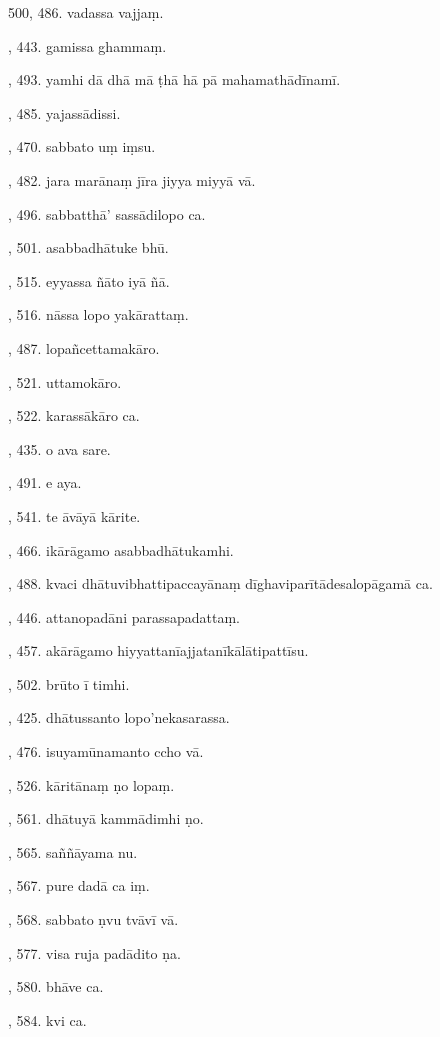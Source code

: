 500, 486. vadassa vajjaṃ.\par {}, 443. gamissa ghammaṃ.\par {}, 493. yamhi dā dhā mā ṭhā hā pā mahamathādīnamī.\par {}, 485. yajassādissi.\par {}, 470. sabbato uṃ iṃsu.\par {}, 482. jara marānaṃ jīra jiyya miyyā vā.\par {}, 496. sabbatthā’ sassādilopo ca.\par {}, 501. asabbadhātuke bhū.\par {}, 515. eyyassa ñāto iyā ñā.\par {}, 516. nāssa lopo yakārattaṃ.\par {}, 487. lopañcettamakāro.\par {}, 521. uttamokāro.\par {}, 522. karassākāro ca.\par {}, 435. o ava sare.\par {}, 491. e aya.\par {}, 541. te āvāyā kārite.\par {}, 466. ikārāgamo asabbadhātukamhi.\par {}, 488. kvaci dhātuvibhattipaccayānaṃ dīghaviparītādesalopāgamā ca.\par {}, 446. attanopadāni parassapadattaṃ.\par {}, 457. akārāgamo hiyyattanīajjatanīkālātipattīsu.\par {}, 502. brūto ī timhi.\par {}, 425. dhātussanto lopo’nekasarassa.\par {}, 476. isuyamūnamanto ccho vā.\par {}, 526. kāritānaṃ ṇo lopaṃ.\par {}, 561. dhātuyā kammādimhi ṇo.\par {}, 565. saññāyama nu.\par {}, 567. pure dadā ca iṃ.\par {}, 568. sabbato ṇvu tvāvī vā.\par {}, 577. visa ruja padādito ṇa.\par {}, 580. bhāve ca.\par {}, 584. kvi ca.\par \noindent
